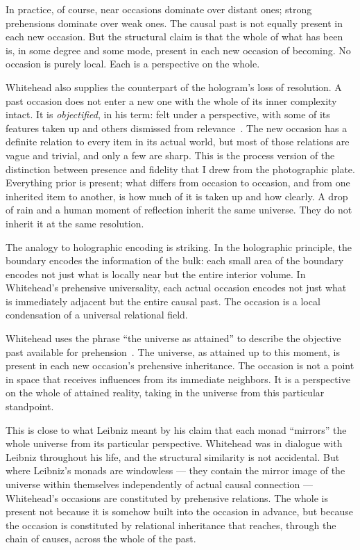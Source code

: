 In practice, of course, near occasions dominate over distant ones; strong prehensions dominate over weak ones.
The causal past is not equally present in each new occasion.
But the structural claim is that the whole of what has been is, in some degree and some mode, present in each new occasion of becoming.
No occasion is purely local.
Each is a perspective on the whole.

Whitehead also supplies the counterpart of the hologram's loss of resolution.
A past occasion does not enter a new one with the whole of its inner complexity intact.
It is \emph{objectified}, in his term: felt under a perspective, with some of its features taken up and others dismissed from relevance~\citep{Whitehead1929}.
The new occasion has a definite relation to every item in its actual world, but most of those relations are vague and trivial, and only a few are sharp.
This is the process version of the distinction between presence and fidelity that I drew from the photographic plate.
Everything prior is present; what differs from occasion to occasion, and from one inherited item to another, is how much of it is taken up and how clearly.
A drop of rain and a human moment of reflection inherit the same universe.
They do not inherit it at the same resolution.

The analogy to holographic encoding is striking.
In the holographic principle, the boundary encodes the information of the bulk: each small area of the boundary encodes not just what is locally near but the entire interior volume.
In Whitehead's prehensive universality, each actual occasion encodes not just what is immediately adjacent but the entire causal past.
The occasion is a local condensation of a universal relational field.

Whitehead uses the phrase ``the universe as attained'' to describe the objective past available for prehension~\citep{Whitehead1929}.
The universe, as attained up to this moment, is present in each new occasion's prehensive inheritance.
The occasion is not a point in space that receives influences from its immediate neighbors.
It is a perspective on the whole of attained reality, taking in the universe from this particular standpoint.

This is close to what Leibniz meant by his claim that each monad ``mirrors'' the whole universe from its particular perspective.
Whitehead was in dialogue with Leibniz throughout his life, and the structural similarity is not accidental.
But where Leibniz's monads are windowless --- they contain the mirror image of the universe within themselves independently of actual causal connection --- Whitehead's occasions are constituted by prehensive relations.
The whole is present not because it is somehow built into the occasion in advance, but because the occasion is constituted by relational inheritance that reaches, through the chain of causes, across the whole of the past.

